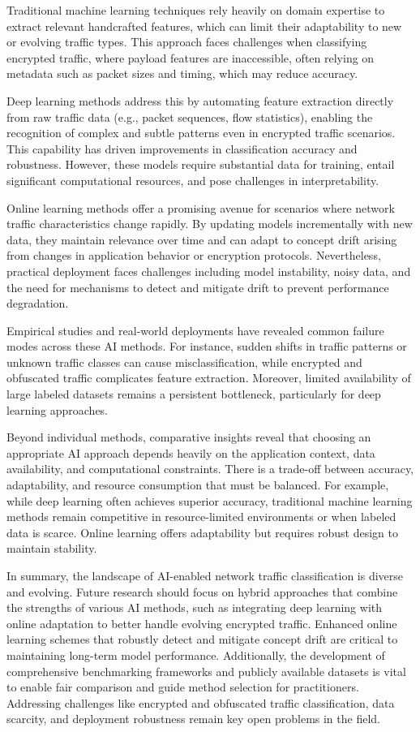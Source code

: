 \documentclass[sigconf]{acmart}
\begin{document}
Traditional machine learning techniques rely heavily on domain expertise to extract relevant handcrafted features, which can limit their adaptability to new or evolving traffic types. This approach faces challenges when classifying encrypted traffic, where payload features are inaccessible, often relying on metadata such as packet sizes and timing, which may reduce accuracy.

Deep learning methods address this by automating feature extraction directly from raw traffic data (e.g., packet sequences, flow statistics), enabling the recognition of complex and subtle patterns even in encrypted traffic scenarios. This capability has driven improvements in classification accuracy and robustness. However, these models require substantial data for training, entail significant computational resources, and pose challenges in interpretability.

Online learning methods offer a promising avenue for scenarios where network traffic characteristics change rapidly. By updating models incrementally with new data, they maintain relevance over time and can adapt to concept drift arising from changes in application behavior or encryption protocols. Nevertheless, practical deployment faces challenges including model instability, noisy data, and the need for mechanisms to detect and mitigate drift to prevent performance degradation.

Empirical studies and real-world deployments have revealed common failure modes across these AI methods. For instance, sudden shifts in traffic patterns or unknown traffic classes can cause misclassification, while encrypted and obfuscated traffic complicates feature extraction. Moreover, limited availability of large labeled datasets remains a persistent bottleneck, particularly for deep learning approaches.

Beyond individual methods, comparative insights reveal that choosing an appropriate AI approach depends heavily on the application context, data availability, and computational constraints. There is a trade-off between accuracy, adaptability, and resource consumption that must be balanced. For example, while deep learning often achieves superior accuracy, traditional machine learning methods remain competitive in resource-limited environments or when labeled data is scarce. Online learning offers adaptability but requires robust design to maintain stability.

In summary, the landscape of AI-enabled network traffic classification is diverse and evolving. Future research should focus on hybrid approaches that combine the strengths of various AI methods, such as integrating deep learning with online adaptation to better handle evolving encrypted traffic. Enhanced online learning schemes that robustly detect and mitigate concept drift are critical to maintaining long-term model performance. Additionally, the development of comprehensive benchmarking frameworks and publicly available datasets is vital to enable fair comparison and guide method selection for practitioners. Addressing challenges like encrypted and obfuscated traffic classification, data scarcity, and deployment robustness remain key open problems in the field.
\end{document}
